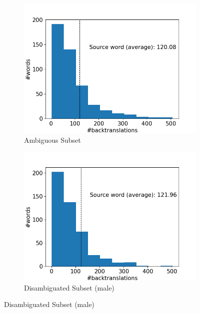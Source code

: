 \begin{figure}[!htb]
     \centering
     
     \begin{subfigure}{0.49\textwidth}
         \centering
         \includegraphics[width=\textwidth]{figures/alignment/align_100/word_backtranslations_original.png}
         \caption{Ambiguous Subset}
     \end{subfigure}
     \hfill
     \begin{subfigure}{0.49\textwidth}
         \centering
         \includegraphics[width=\textwidth]{figures/alignment/align_100/word_backtranslations_male.png}
         \caption{Disambiguated Subset (male)}

\end{subfigure}
\end{figure}
